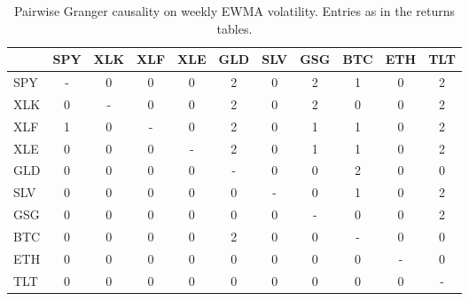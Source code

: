 \begin{table}[H]
\centering
\small
\begin{tabular}{lcccccccccc}
\toprule
 & SPY & XLK & XLF & XLE & GLD & SLV & GSG & BTC & ETH & TLT \\
\midrule
SPY & - & 0 & 0 & 0 & 2 & 0 & 2 & 1 & 0 & 2 \\
XLK & 0 & - & 0 & 0 & 2 & 0 & 2 & 0 & 0 & 2 \\
XLF & 1 & 0 & - & 0 & 2 & 0 & 1 & 1 & 0 & 2 \\
XLE & 0 & 0 & 0 & - & 2 & 0 & 1 & 1 & 0 & 2 \\
GLD & 0 & 0 & 0 & 0 & - & 0 & 0 & 2 & 0 & 0 \\
SLV & 0 & 0 & 0 & 0 & 0 & - & 0 & 1 & 0 & 2 \\
GSG & 0 & 0 & 0 & 0 & 0 & 0 & - & 0 & 0 & 2 \\
BTC & 0 & 0 & 0 & 0 & 2 & 0 & 0 & - & 0 & 0 \\
ETH & 0 & 0 & 0 & 0 & 0 & 0 & 0 & 0 & - & 0 \\
TLT & 0 & 0 & 0 & 0 & 0 & 0 & 0 & 0 & 0 & - \\
\bottomrule
\end{tabular}
\caption{Pairwise Granger causality on weekly EWMA volatility. Entries as in the returns tables.}
\label{tab:vol_weekly}
\end{table}